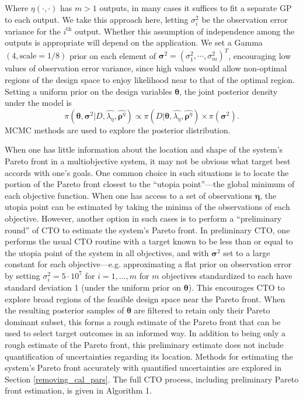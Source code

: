\documentclass[twocolumn,10pt]{asme2ej}
\begin{document}
%
Where $\eta(\cdot,\cdot)$ has $m>1$ outputs, in many cases it suffices to fit a separate GP to each output.
%
We take this approach here, letting $\sigma^2_i$ be the observation error variance for the $i^\text{th}$ output.
%
Whether this assumption of independence among the outputs is appropriate will depend on the application.
%
We set a Gamma $(4,\mathrm{scale }=1/8)$ prior on each element of $\boldsymbol\sigma^2=(\sigma^2_1,\cdots,\sigma^2_m)^T$, encouraging low values of observation error variance, since high values would allow non-optimal regions of the design space to enjoy likelihood near to that of the optimal region.
%
Setting a uniform prior on the design variables $\boldsymbol\theta$, the joint posterior density under the model is
%
\begin{equation} \label{eq:full_dist}
\pi(\boldsymbol \theta,\boldsymbol \sigma^2| D,\widehat{\lambda_\eta},\widehat{\boldsymbol \rho^\eta})
\propto \pi(D | \boldsymbol \theta,\widehat{\lambda_\eta}, \widehat{\boldsymbol \rho^\eta}) \times \pi(\boldsymbol \sigma^2).
\end{equation}
%
MCMC methods are used to explore the posterior distribution.
%

%
When one has little information about the location and shape of the system's Pareto front in a multiobjective system, it may not be obvious what target best accords with one's goals.
%
One common choice in such situations is to locate the portion of the Pareto front closest to the ``utopia point''---the global minimum of each objective function.
%
When one has access to a set of observations $\boldsymbol\eta$, the utopia point can be estimated by taking the minima of the observations of each objective.
%
However, another option in such cases is to perform a ``preliminary round'' of CTO to estimate the system's Pareto front.
%
In preliminary CTO, one performs the usual CTO routine with a target known to be less than or equal to the utopia point of the system in all objectives, and with $\boldsymbol\sigma^2$ set to a large constant for each objective---e.g. approximating a flat prior on observation error by setting $\sigma^2_i =5\cdot10^7$ for $i=1,\ldots,m$ for $m$ objectives standardized to each have standard deviation 1 (under the uniform prior on $\boldsymbol\theta$).
%
This encourages CTO to explore broad regions of the feasible design space near the Pareto front.
%
When the resulting posterior samples of $\boldsymbol\theta$ are filtered to retain only their Pareto dominant subset, this forms a rough estimate of the Pareto front that can be used to select target outcomes in an informed way.
%
In addition to being only a rough estimate of the Pareto front, this preliminary estimate does not include quantification of uncertainties regarding its location.
%
Methods for estimating the system's Pareto front accurately with quantified uncertainties are explored in Section \ref{removing_cal_pars}.
%
The full CTO process, including preliminary Pareto front estimation, is given in Algorithm 1.
\end{document}
